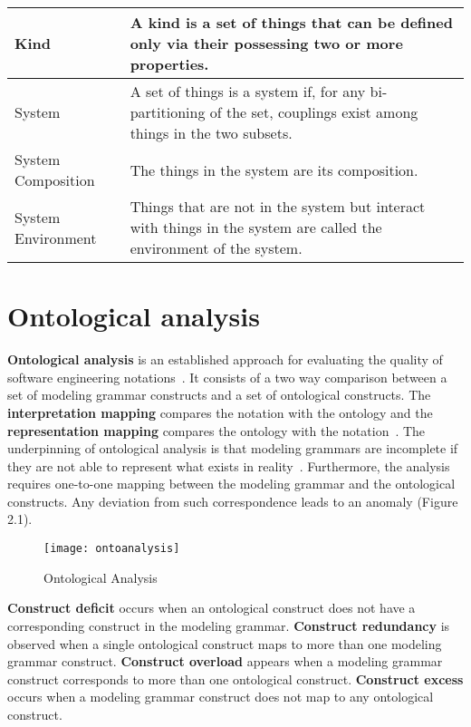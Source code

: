\documentclass[parskip=full]{uvamscse}
\begin{document}
\begin{center}
\begin{longtable}{ | p{11em} | p{30em} | }
 \hline
 Kind & A kind is a set of things that can be defined only via their possessing two or more properties. \\ 
\hline
 System & A set of things is a system if, for any bi-partitioning of the set, couplings exist among things in the two subsets. \\
 \hline
 System Composition & The things in the system are its composition. \\
 \hline
 System Environment &  Things that are not in the system but interact with things in the system are called the environment of the system. \\
 \hline
\end{longtable}
\end{center}


\section{Ontological analysis}

\textbf{Ontological analysis} is an established approach for evaluating the quality of software engineering notations~\cite{moody2009physics}. It consists of a two way comparison between a set of modeling grammar constructs and a set of ontological constructs. The \textbf{interpretation mapping} compares the notation with the ontology and the \textbf{representation mapping} compares the ontology with the notation~\cite{gehlert2007toward}. The underpinning of ontological analysis is that modeling grammars are incomplete if they are not able to represent what exists in reality~\cite{green2000integrated}. Furthermore, the analysis requires one-to-one mapping between the modeling grammar and the ontological constructs. Any deviation from such correspondence leads to an anomaly (Figure 2.1).

\begin{figure}[h!]
  \centering
  \caption{Ontological Analysis~\cite{gehlert2007toward}}
  \texttt{[image: ontoanalysis]}
\end{figure}

\textbf{Construct deficit} occurs when an ontological construct does not have a corresponding construct in the modeling grammar. \textbf{Construct redundancy} is observed when a single ontological construct maps to more than one modeling grammar construct. \textbf{Construct overload} appears when a modeling grammar construct corresponds to more than one ontological construct. \textbf{Construct excess} occurs when a modeling grammar construct does not map to any ontological construct.~\cite{moody2009physics}
\end{document}
